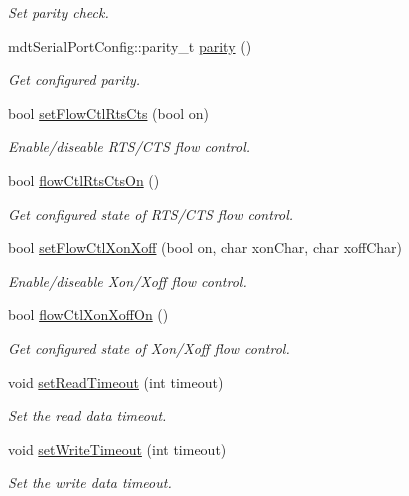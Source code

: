 \begin{DoxyCompactItemize}
\begin{DoxyCompactList}\small\item\em Set parity check. \end{DoxyCompactList}\item 
mdtSerialPortConfig::parity\_\-t \hyperlink{classmdt_serial_port_a98938e2c51d1888236b920903f99050a}{parity} ()
\begin{DoxyCompactList}\small\item\em Get configured parity. \end{DoxyCompactList}\item 
bool \hyperlink{classmdt_serial_port_a175785be0dfe124254484822b7b8832e}{setFlowCtlRtsCts} (bool on)
\begin{DoxyCompactList}\small\item\em Enable/diseable RTS/CTS flow control. \end{DoxyCompactList}\item 
bool \hyperlink{classmdt_serial_port_a9315ed0c7854a09716a4585efb0094c7}{flowCtlRtsCtsOn} ()
\begin{DoxyCompactList}\small\item\em Get configured state of RTS/CTS flow control. \end{DoxyCompactList}\item 
bool \hyperlink{classmdt_serial_port_a34e2ac7b0d3cb7a6fb65756cbca2ce48}{setFlowCtlXonXoff} (bool on, char xonChar, char xoffChar)
\begin{DoxyCompactList}\small\item\em Enable/diseable Xon/Xoff flow control. \end{DoxyCompactList}\item 
bool \hyperlink{classmdt_serial_port_a8d3e3eb1d2272129b8b97377dff1d5d4}{flowCtlXonXoffOn} ()
\begin{DoxyCompactList}\small\item\em Get configured state of Xon/Xoff flow control. \end{DoxyCompactList}\item 
void \hyperlink{classmdt_serial_port_a9105e5a3a640b56097c1156000ace933}{setReadTimeout} (int timeout)
\begin{DoxyCompactList}\small\item\em Set the read data timeout. \end{DoxyCompactList}\item 
void \hyperlink{classmdt_serial_port_a036f49d743838013c9a8cbf6a1dd40d1}{setWriteTimeout} (int timeout)
\begin{DoxyCompactList}\small\item\em Set the write data timeout. \end{DoxyCompactList}\item 

\end{DoxyCompactItemize}
